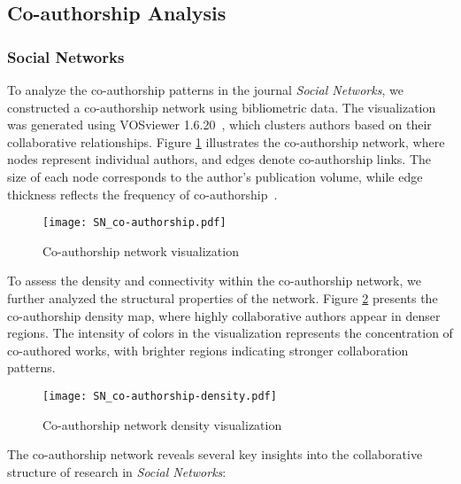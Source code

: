 \documentclass[twocolumn]{article}
\begin{document}
		\subsection{Co-authorship Analysis}
		
		\subsubsection*{Social Networks}
		
		To analyze the co-authorship patterns in the journal \textit{Social Networks}, we constructed a co-authorship network using bibliometric data. The visualization was generated using VOSviewer 1.6.20~\cite{van2010visualizing}, which clusters authors based on their collaborative relationships. Figure \ref{fig.fig13} illustrates the co-authorship network, where nodes represent individual authors, and edges denote co-authorship links. The size of each node corresponds to the author's publication volume, while edge thickness reflects the frequency of co-authorship~\cite{glanzel2004handbook, newman2004coauthorship}.
		
		
		\begin{figure}[htbp]
			\centering
			\texttt{[image: SN\_co-authorship.pdf]}
			\caption{Co-authorship network visualization}
			\label{fig.fig13}
		\end{figure}
		
		To assess the density and connectivity within the co-authorship network, we further analyzed the structural properties of the network. Figure \ref{fig.fig14} presents the co-authorship density map, where highly collaborative authors appear in denser regions. The intensity of colors in the visualization represents the concentration of co-authored works, with brighter regions indicating stronger collaboration patterns.
		
		\begin{figure}[htbp]
			\centering
			\texttt{[image: SN\_co-authorship-density.pdf]}
			\caption{Co-authorship network density visualization}
			\label{fig.fig14}
		\end{figure}
		
		The co-authorship network reveals several key insights into the collaborative structure of research in \textit{Social Networks}:
		
\end{document}
